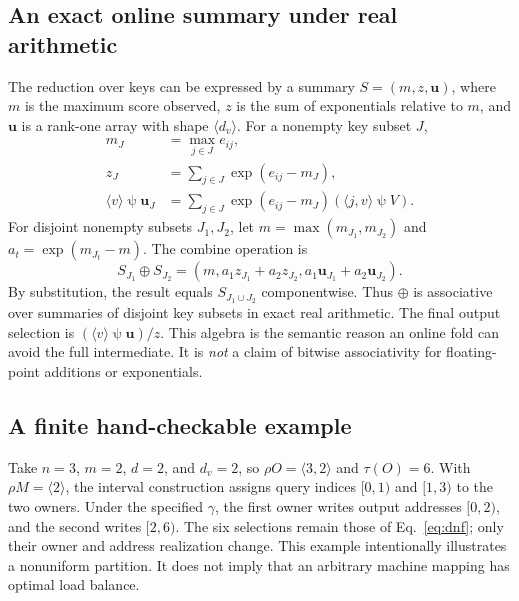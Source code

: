 \documentclass[sigplan,10pt,review,anonymous,balance=false,pbalance=false]{acmart}
\newcommand{\ps}{\mathbin{\psi}}
\begin{document}
\subsection{An exact online summary under real arithmetic}
The reduction over keys can be expressed by a summary $S=(m,z,\mathbf u)$, where $m$ is the maximum score observed, $z$ is the sum of exponentials relative to $m$, and $\mathbf u$ is a rank-one array with shape $\langle d_v\rangle$. For a nonempty key subset $J$,
\begin{align}
 m_J&=\max_{j\in J}e_{ij},\\
 z_J&=\sum_{j\in J}\exp(e_{ij}-m_J),\\
 \langle v\rangle\ps\mathbf u_J&=\sum_{j\in J}\exp(e_{ij}-m_J)
 (\langle j,v\rangle\ps V).
\end{align}
For disjoint nonempty subsets $J_1,J_2$, let $m=\max(m_{J_1},m_{J_2})$ and $a_t=\exp(m_{J_t}-m)$. The combine operation is
\begin{equation}
 S_{J_1}\oplus S_{J_2}=
 (m,a_1z_{J_1}+a_2z_{J_2},a_1\mathbf u_{J_1}+a_2\mathbf u_{J_2}).
 \label{eq:combine}
\end{equation}
By substitution, the result equals $S_{J_1\cup J_2}$ componentwise. Thus $\oplus$ is associative over summaries of disjoint key subsets in exact real arithmetic. The final output selection is $(\langle v\rangle\ps\mathbf u)/z$. This algebra is the semantic reason an online fold can avoid the full intermediate. It is \emph{not} a claim of bitwise associativity for floating-point additions or exponentials.

\subsection{A finite hand-checkable example}
Take $n=3$, $m=2$, $d=2$, and $d_v=2$, so $\rho O=\langle3,2\rangle$ and $\tau(O)=6$. With $\rho M=\langle2\rangle$, the interval construction assigns query indices $[0,1)$ and $[1,3)$ to the two owners. Under the specified $\gamma$, the first owner writes output addresses $[0,2)$, and the second writes $[2,6)$. The six selections remain those of Eq.~\eqref{eq:dnf}; only their owner and address realization change. This example intentionally illustrates a nonuniform partition. It does not imply that an arbitrary machine mapping has optimal load balance.
\end{document}
